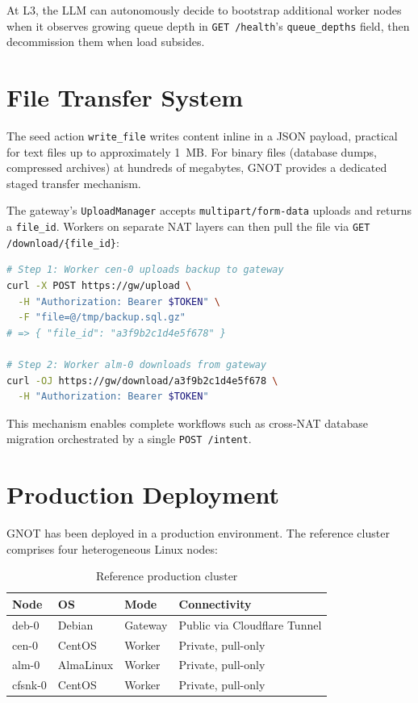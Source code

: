 \documentclass[10pt,twocolumn]{article}
\begin{document}
At L3, the LLM can autonomously decide to bootstrap additional worker
nodes when it observes growing queue depth in \texttt{GET /health}'s
\texttt{queue\_depths} field, then decommission them when load subsides.

\section{File Transfer System}
\label{sec:files}

The seed action \texttt{write\_file} writes content inline in a JSON
payload, practical for text files up to approximately 1~MB. For binary
files (database dumps, compressed archives) at hundreds of megabytes,
GNOT provides a dedicated staged transfer mechanism.

The gateway's \texttt{UploadManager} accepts \texttt{multipart/form-data}
uploads and returns a \texttt{file\_id}. Workers on separate NAT layers
can then pull the file via \texttt{GET /download/\{file\_id\}}:

\begin{lstlisting}[language=bash, caption={Cross-NAT binary file transfer}]
# Step 1: Worker cen-0 uploads backup to gateway
curl -X POST https://gw/upload \
  -H "Authorization: Bearer $TOKEN" \
  -F "file=@/tmp/backup.sql.gz"
# => { "file_id": "a3f9b2c1d4e5f678" }

# Step 2: Worker alm-0 downloads from gateway
curl -OJ https://gw/download/a3f9b2c1d4e5f678 \
  -H "Authorization: Bearer $TOKEN"
\end{lstlisting}

This mechanism enables complete workflows such as cross-NAT database
migration orchestrated by a single \texttt{POST /intent}.

\section{Production Deployment}
\label{sec:deployment}

GNOT has been deployed in a production environment. The reference cluster
comprises four heterogeneous Linux nodes:

\begin{table}[h]
\centering
\caption{Reference production cluster}
\label{tab:cluster}
\small
\begin{tabular}{@{}lllp{2.8cm}@{}}
\toprule
\textbf{Node} & \textbf{OS} & \textbf{Mode} & \textbf{Connectivity} \\
\midrule
deb-0 & Debian & Gateway & Public via Cloudflare Tunnel \\
cen-0 & CentOS & Worker & Private, pull-only \\
alm-0 & AlmaLinux & Worker & Private, pull-only \\
cfsnk-0 & CentOS & Worker & Private, pull-only \\
\bottomrule
\end{tabular}
\end{table}
\end{document}
